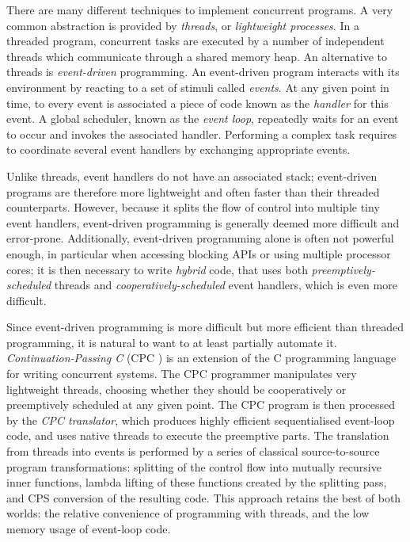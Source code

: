 \documentclass[a4paper]{llncs}
\begin{document}
There are many different techniques to implement concurrent programs.  A very
common abstraction is provided by \emph{threads}, or \emph{lightweight
processes}.  In a threa\-ded program, concurrent tasks are executed by a number of
independent threads which communicate through a shared memory heap.  An
alternative to threads is \emph{event-driven} programming.  An event-driven
program interacts with its environment by reacting to a set of stimuli called
\emph{events}.  At any given point in time, to every event is associated a piece
of code known as the \emph{handler} for this event.  A global scheduler, known
as the \emph{event loop}, repeatedly waits for an event to occur and invokes the
associated handler.  Performing a complex task requires to coordinate several
event handlers by exchanging appropriate events.

Unlike threads, event handlers do not have an associated stack; event-driven
programs are therefore more lightweight and often faster than their threaded
counterparts.  However, because it splits the flow of control into multiple tiny
event handlers, event-driven programming is generally deemed more difficult and
error-prone.  Additionally, event-driven programming alone is often not powerful
enough, in particular when accessing blocking APIs or using multiple processor
cores; it is then necessary to write \emph{hybrid} code, that uses both
\emph{preemptively-scheduled} threads and \emph{cooperatively-scheduled} event
handlers, which is even more difficult.

Since event-driven programming is more difficult but more efficient than
threaded programming, it is natural to want to at least partially automate it.
\emph{Continuation-Passing C} (CPC \cite{kerneis2011}) is an extension of the C
programming language for writing concurrent systems.  The CPC programmer
manipulates very lightweight threads, choosing whether they should be
cooperatively or preemptively scheduled at any given point.  The CPC program is
then processed by the \emph{CPC translator}, which produces highly efficient
sequentialised event-loop code, and uses native threads to execute the
preemptive parts.  The translation from threads into events is performed by a
series of classical source-to-source program transformations: splitting of the
control flow into mutually recursive inner functions, lambda lifting of these
functions created by the splitting pass, and CPS conversion of the resulting
code.  This approach retains the best of both worlds: the relative convenience
of programming with threads, and the low memory usage of event-loop code.
\end{document}
